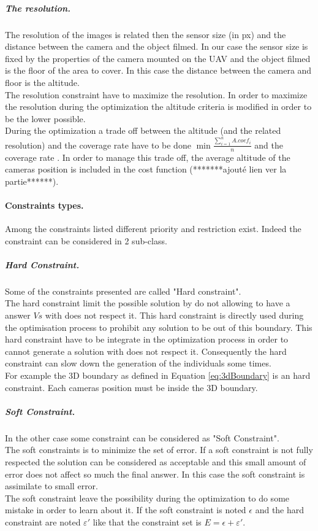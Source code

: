 \subparagraph{The resolution.}
The resolution of the images is related then the sensor size (in px) and  the distance between the camera and the object filmed. In our case the sensor size is fixed by the properties of the camera mounted on the UAV and the object filmed is the floor of the area to cover. In this case the distance between the camera and floor is the altitude. \\
The resolution constraint have to maximize the resolution. In order to maximize the resolution during the optimization the altitude criteria is modified in order to be the lower possible.\\
During the optimization a trade off between the altitude (and the related resolution) and the coverage rate have to be done $\min{\frac{\sum^n_{i=1}{A.coef_i}}{n}}$ and the coverage rate . In order to manage this trade off, the average altitude of the cameras position is included in the cost function (*******ajouté lien ver la partie******). 
 
\paragraph*{Constraints types.}
 
Among the constraints listed different priority and restriction exist. Indeed the constraint can be considered in 2 sub-class. 
\subparagraph{Hard Constraint.}
 Some of the constraints presented are called "Hard constraint". \\
 The hard constraint limit the possible solution by do not allowing to have a answer $Vs$ with does not respect it. This hard constraint is directly used during the optimisation process to prohibit any solution to be out of this boundary. This hard constraint have to be integrate in the optimization process in order to cannot  generate a solution with does not respect it. Consequently the hard constraint can slow down the generation of the individuals some times.\\ 
 For example the 3D boundary as defined in Equation \ref{eq:3dBoundary} is an hard constraint. Each cameras position must be inside the 3D boundary.\\
 
 \subparagraph{Soft Constraint.}
 In the other case some constraint can be considered as "Soft Constraint".\\ 
 The soft constraints is to minimize the set of error. If a soft constraint is not fully respected the solution can be considered as acceptable and this small amount of error does not affect so much the final answer. In this case the soft constraint is assimilate to small error. \\
 The soft constraint leave the possibility during the optimization to do some mistake in order to learn about it.  
 If the soft constraint is noted $\epsilon$ and the hard constraint are noted $ \varepsilon '$ like that the constraint set is $E=\epsilon+\varepsilon'$.\\
 
